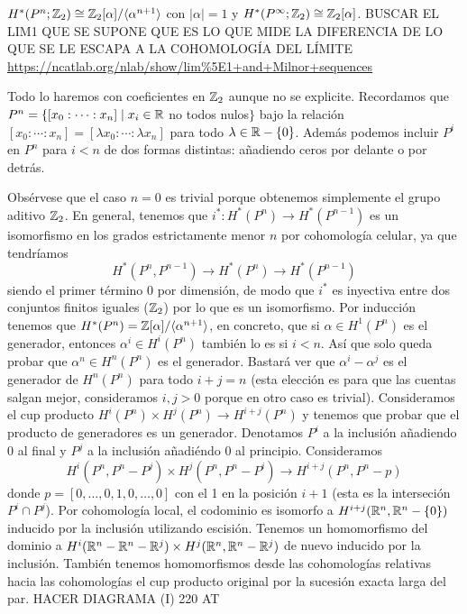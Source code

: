 \documentclass[TA.tex]{subfiles}
\begin{document}
\begin{teorema}
$H^*(P^n;\mathbb{Z}_2)\cong\mathbb{Z}_2[\alpha]/\langle{\alpha^{n+1}}\rangle$ con $|\alpha|=1$ y $H^*(P^\infty;\mathbb{Z}_2)\cong\mathbb{Z}_2[\alpha]$. BUSCAR EL LIM1 QUE SE SUPONE QUE ES LO QUE MIDE LA DIFERENCIA DE LO QUE SE LE ESCAPA A LA COHOMOLOGÍA DEL LÍMITE \url{https://ncatlab.org/nlab/show/lim%5E1+and+Milnor+sequences}
\end{teorema}
\begin{dem}
Todo lo haremos con coeficientes en $\mathbb{Z}_2$ aunque no se explicite. Recordamos que $P^n=\{[x_0:\cdots :x_n]\mid x_i\in\mathbb{R}$ no todos nulos$\}$ bajo la relación $[x_0:\cdots :x_n]=[\lambda x_0:\cdots :\lambda x_n]$ para todo $\lambda\in\mathbb{R}-\{0\}$. Además podemos incluir $P^i$ en $P^n$ para $i<n$ de dos formas distintas: añadiendo ceros por delante o por detrás. 

Obsérvese que el caso $n=0$ es trivial porque obtenemos simplemente el grupo aditivo $\mathbb{Z}_2$. En general, tenemos que $i^*:H^*(P^n)\to H^*(P^{n-1})$ es un isomorfismo en los grados estrictamente menor $n$ por cohomología celular, ya que tendríamos
\[
H^*(P^n,P^{n-1})\to H^*(P^n)\to H^*(P^{n-1})
\]
siendo el primer término 0 por dimensión, de modo que $i^*$ es inyectiva entre dos conjuntos finitos iguales ($\mathbb{Z}_2$) por lo que es un isomorfismo. Por inducción tenemos que $H^*(P^n)=\mathbb{Z}[\alpha]/\langle{\alpha^{n+1}}\rangle$, en concreto, que si $\alpha\in H^1(P^n)$ es el generador, entonces $\alpha^i\in H^i(P^n)$ también lo es si $i<n$. Así que solo queda probar que $\alpha^n\in H^n(P^n)$ es el generador. Bastará ver que $\alpha^i-\alpha^j$ es el generador de $H^n(P^n)$ para todo $i+j=n$ (esta elección es para que las cuentas salgan mejor, consideramos $i,j>0$ porque en otro caso es trivial). Consideramos el cup producto $H^i(P^n)\times H^j(P^n)\to H^{i+j}(P^n)$ y tenemos que probar que el producto de generadores es un generador. Denotamos $P^i$ a la inclusión añadiendo 0 al final y $P^j$ a la inclusión añadiéndo 0 al principio. Consideramos 
\[
H^i(P^n,P^n-P^j)\times H^j(P^n,P^n-P^i)\to H^{i+j}(P^n,P^n-p)
\]
donde $p=[0,\dots, 0,1,0,\dots, 0]$ con el 1 en la posición $i+1$ (esta es la interseción $P^i\cap P^j$). Por cohomología local, el codominio es isomorfo a $H^{i+j}(\mathbb{R}^n,\mathbb{R}^n-\{0\})$ inducido por la inclusión utilizando escisión. Tenemos un homomorfismo del dominio a $H^i(\mathbb{R}^n-\mathbb{R}^n-\mathbb{R}^j)\times  H^j(\mathbb{R}^n,\mathbb{R}^n-\mathbb{R}^j)$ de nuevo inducido por la inclusión. También tenemos homomorfismos desde las cohomologías relativas hacia las cohomologías el cup producto original por la sucesión exacta larga del par. HACER DIAGRAMA (I) 220 AT


\end{dem}
\end{document}
